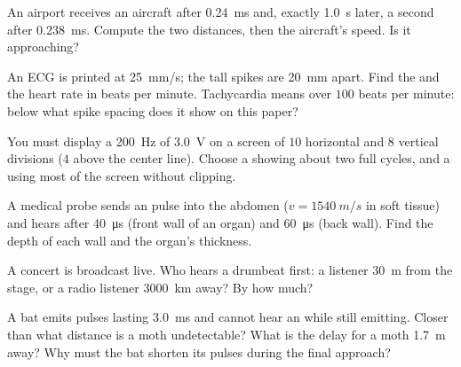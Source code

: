 \begin{exercise}[$\star\star$]\label{exo:g10:signals-and-waves:7}
An airport  receives an aircraft  after \qty{0.24}{ms} and,
exactly \qty{1.0}{s} later, a second  after \qty{0.238}{ms}. Compute
the two distances, then the aircraft's speed. Is it approaching?
\end{exercise}

\begin{exercise}[$\star\star$]\label{exo:g10:signals-and-waves:8}
An ECG is printed at \qty{25}{mm/s}; the tall spikes are \qty{20}{mm}
apart. Find the  and the heart rate in beats per minute.
Tachycardia means over $100$ beats per minute: below what spike spacing
does it show on this paper?
\end{exercise}

\begin{exercise}[$\star\star$]\label{exo:g10:signals-and-waves:9}
You must display a \qty{200}{Hz}  of  \qty{3.0}{V} on a
screen of $10$ horizontal and $8$ vertical divisions ($4$ above the
center line). Choose a  showing about two full cycles, and a
 using most of the screen without clipping.
\end{exercise}

\begin{exercise}[$\star\star$]\label{exo:g10:signals-and-waves:10}
A medical probe sends an  pulse into the abdomen
($v = \qty{1540}{m/s}$ in soft tissue) and hears  after
\qty{40}{\micro s} (front wall of an organ) and \qty{60}{\micro s} (back
wall). Find the depth of each wall and the organ's thickness.
\end{exercise}

\begin{exercise}[$\star\star$]\label{exo:g10:signals-and-waves:11}
A concert is broadcast live. Who hears a drumbeat first: a listener
\qty{30}{m} from the stage, or a radio listener \qty{3000}{km} away? By
how much?
\end{exercise}

\begin{exercise}[$\star\star\star$]\label{exo:g10:signals-and-waves:12}
A bat emits  pulses lasting \qty{3.0}{ms} and cannot hear an
 while still emitting. Closer than what distance is a moth
undetectable? What is the  delay for a moth \qty{1.7}{m} away? Why
must the bat shorten its pulses during the final approach?
\end{exercise}

